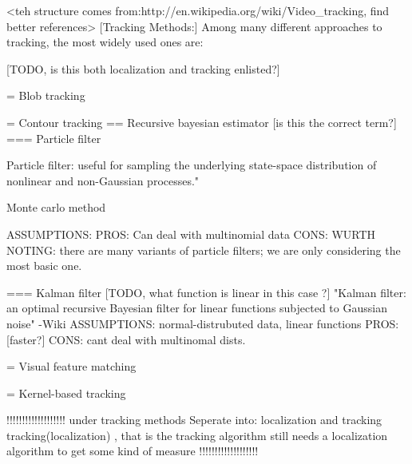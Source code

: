 <teh structure comes from:http://en.wikipedia.org/wiki/Video_tracking, find better references>
[Tracking Methods:]
Among many different approaches to tracking, the most widely used ones are:

[TODO, is this both localization and tracking enlisted?]

= Blob tracking

= Contour tracking
== Recursive bayesian estimator [is this the correct term?]
=== Particle filter

Particle filter: useful for sampling the underlying state-space distribution of nonlinear and non-Gaussian processes."

Monte carlo method

{ASSUMPTIONS:}
{PROS: Can deal with multinomial data}
{CONS:}
{WURTH NOTING: there are many variants of particle filters; we are only considering the most basic one. }

=== Kalman filter
[TODO, what function is linear in this case ?]
"Kalman filter: an optimal recursive Bayesian filter for linear functions subjected to Gaussian noise" -Wiki
{ASSUMPTIONS: normal-distrubuted data, linear functions}
{PROS: [faster?]}
{CONS: cant deal with multinomal dists.}

= Visual feature  matching 

= Kernel-based tracking


!!!!!!!!!!!!!!!!!!!
under tracking methods
Seperate into: localization and tracking 
tracking(localization) , that is the tracking algorithm still needs a localization algorithm to get some kind of measure
!!!!!!!!!!!!!!!!!!!






